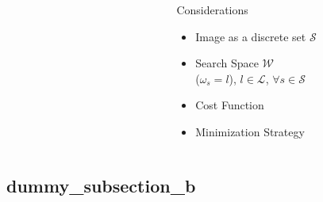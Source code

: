 \begin{frame}
\begin{columns}
\begin{column}{.6\textwidth}
\begin{figure}
	\end{figure}
\end{column}
\begin{column}{.4\textwidth}
  \begin{block}{Considerations}
    \begin{itemize}
        \item Image as a discrete set $\mathcal{S}$
        \item Search Space $\mathcal{W}$\\
          {\small($\omega_s = l$), $l \in \mathcal{L}$, $\forall s \in \mathcal{S}$}
        \item Cost Function
        \item Minimization Strategy
    \end{itemize}
  \end{block}
\end{column}
\end{columns}
\end{frame}

\subsection{dummy_subsection_b}

